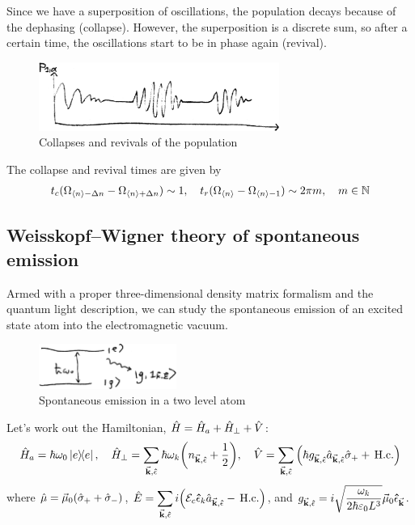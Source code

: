 Since we have a superposition of oscillations, the population decays because of the dephasing (collapse). However, the superposition is a discrete sum, so after a certain time, the oscillations start to be in phase again (revival).
\begin{figure}[H]
	\centering
	\includegraphics[width=0.7\textwidth]{./images/5-collapses-revivals}
	\caption{Collapses and revivals of the population}
	\label{fig:collapses-revivals}
\end{figure}
The collapse and revival times are given by
\begin{align}
	t_{c}(\Omega_{\ev{n} - \Delta n} - \Omega_{\ev{n} + \Delta n} ) \sim 1 \qc t_{r}(\Omega_{\ev{n}} - \Omega_{\ev{n} -1} ) \sim 2\pi m \qc m \in \mbb{N}
\end{align}

\subsection{Weisskopf--Wigner theory of spontaneous emission}
Armed with a proper three-dimensional density matrix formalism and the quantum light description, we can study the spontaneous emission of an excited state atom into the electromagnetic vacuum.
\begin{figure}[H]
	\centering
	\includegraphics[width=0.4\textwidth]{./images/5-two-level-weisskopf}
	\caption{Spontaneous emission in a two level atom}
	\label{figtwo-level-weisskopf:}
\end{figure}

Let's work out the Hamiltonian, $\hat{H} = \hat{H}_{a} + {\hat{H}}_{\perp} + \hat{V}$:
\begin{align}
	\hat{H}_{a} = \hbar \omega_{0} \dyad{e} \qc \trn{\hat{H}} = \sum_{\va{k},\vu{\epsilon}} \hbar \omega_{k} \qty(n_{\va{k},\vu{\epsilon}} + \frac{1}{2}) \qc \hat{V} = \sum_{\va{k},\vu{\epsilon}} \qty(\hbar g_{\va{k},\vu{\epsilon}} \hat{a}_{\va{k},\vu{\epsilon}} \hat{\sigma}_{+} + \Hc )
\end{align}
where $\hat{\mu} = \va{\mu}_{0} (\hat{\sigma}_{+} + \hat{\sigma}_{-})$, $\displaystyle \hat{E} = \sum_{\va{k},\vu{\epsilon}} i\qty(\mathcal{E}_{c} \vu{\epsilon}_{k} \hat{a}_{\va{k},\vu{\epsilon}} - \,\text{H.c.} )$, and $\displaystyle g_{\va{k},\vu{\epsilon}} = i \sqrt{\frac{\omega_{k}}{2 \hbar \varepsilon_{0} L^{3} }} \va{\mu}_{0} \vu{\epsilon}_{\va{k}}$.

